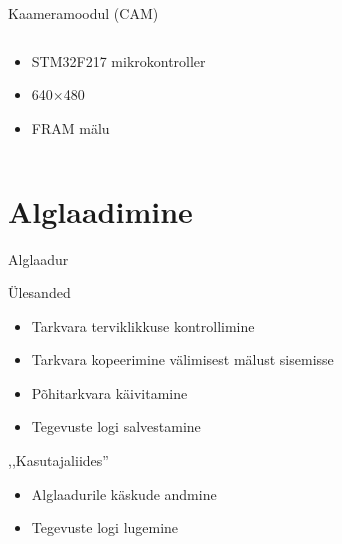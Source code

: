 \documentclass[pdf]{beamer}
\begin{document}
\begin{frame}{Kaameramoodul (CAM)}
	\begin{columns}
		\begin{column}{0.5\textwidth}
			\begin{itemize}
				\item STM32F217 mikrokontroller
				\item 640\(\times\)480 
				\item FRAM mälu
			\end{itemize}
		\end{column}
		\begin{column}{0.5\textwidth}
		\end{column}
	\end{columns}
\end{frame}

\section{Alglaadimine}
\begin{frame}{Alglaadur}
	\begin{block}{Ülesanded}
		\begin{itemize}
			\item Tarkvara terviklikkuse kontrollimine
			\item Tarkvara kopeerimine välimisest mälust sisemisse
			\item Põhitarkvara käivitamine
			\item Tegevuste logi salvestamine
		\end{itemize}
	\end{block}
	\begin{block}{,,Kasutajaliides''}
		\begin{itemize}
			\item Alglaadurile käskude andmine
			\item Tegevuste logi lugemine
		\end{itemize}
	\end{block}
\end{frame}
\end{document}
